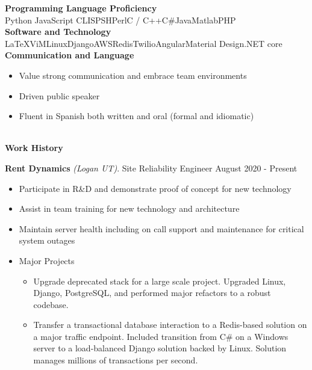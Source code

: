 \documentclass[letterpaper,11pt]{article}
\begin{document}
\textbf{Programming Language Proficiency} \\
Python \hfill JavaScript \hfill CLISP\hfill SH\hfill Perl\hfill C / C++\hfill C\#\hfill Java\hfill Matlab\hfill PHP\\

\textbf{Software and Technology}\\
\LaTeX\hfill ViM\hfill Linux\hfill Django\hfill AWS\hfill Redis\hfill Twilio\hfill Angular\hfill Material Design\hfill .NET core\\

\noindent\textbf{Communication and Language}
\begin{itemize}[noitemsep,topsep=0pt]
	\item Value strong communication and embrace team environments
	\item Driven public speaker
	\item Fluent in Spanish both written and oral (formal and idiomatic)
\end{itemize}


\begin{Large}\textbf{\\Work History}\end{Large}

\textbf{Rent Dynamics} \textit{(Logan UT)}. Site Reliability Engineer \hfill August 2020 - Present
\begin{itemize}[noitemsep,topsep=0pt]
	\item Participate in R\&D and demonstrate proof of concept for new technology
	\item Assist in team training for new technology and architecture
	\item Maintain server health including on call support and maintenance for critical system outages
	\item Major Projects \begin{itemize}[noitemsep, topsep=0pt]
		\item Upgrade deprecated stack for a large scale project. Upgraded Linux, Django, PostgreSQL, and performed major refactors to a robust codebase.
		\item Transfer a transactional database interaction to a Redis-based solution on a major traffic endpoint. Included transition from C\# on a Windows server to a load-balanced Django solution backed by Linux. Solution manages millions of transactions per second.\\
	\end{itemize}
\end{itemize}
\end{document}
